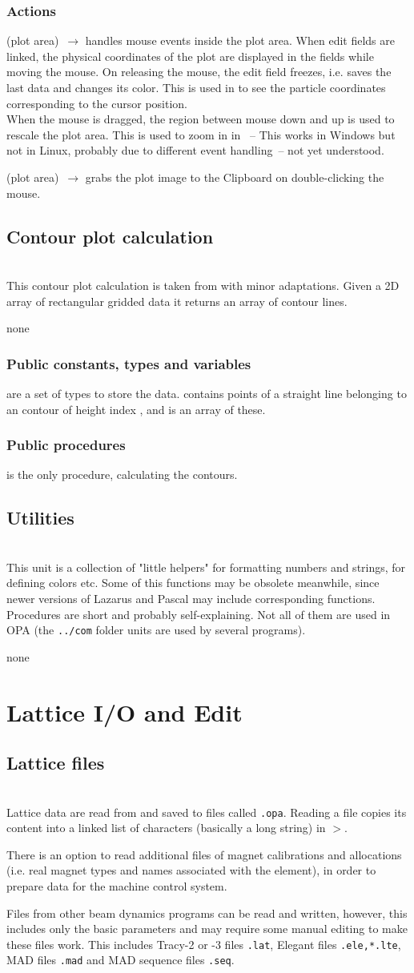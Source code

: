 \documentclass[12pt]{article}
\newcommand\code[1]{{\tt #1}}
\newcommand{\ofldx}[1]{\colorbox{black!15}{{\color{black}(#1)}}}
\newcommand\guico[1]{{\color{blue}\code{#1}}}
\newcommand\guifco[1]{{\color{violet}\code{#1}}}
\newcommand{\unico}[1]{{\color{burntorange}\code{#1}}}
\newcommand{\evcodxf}[2]{\ofldx{#1}~$\rightarrow$ \guifco{#2}}
\newcommand{\grcod}[2]{\opagui{#1}$>$\guico{#2}}
\newcommand{\opagui}[1]{\colorbox{blue!20}{{\color{black}\code{#1}}}}
\newcommand{\ogui}[1]{\hyperref[#1]{\opagui{#1}}}
\newcommand{\opauni}[1]{\colorbox{orange!30}{{\color{black}\code{#1}}}}
\newcommand{\ounih}[2]{\subsection{\label{#2}#1}{\Huge\opauni{#2}}\\}
\newcommand{\uses}[1]{\flushleft {\bf Uses:} #1}
\newcommand{\desc}[1]{#1}
\newcommand{\act}[1]{\subsubsection*{Actions} #1}
\newcommand{\pvar}[1]{\subsubsection*{Public constants, types and variables} #1}
\newcommand{\ppro}[1]{\subsubsection*{Public procedures} #1}
\newcommand{\todo}[1]{{\color{red} #1}}
\begin{document}
\act{
\evcodxf{plot area}{pMouseDown,pMouseMove,pMouseUp} handles mouse events inside the plot area.
When edit fields are linked, the physical coordinates of the plot are displayed in the fields while moving the mouse. On releasing the mouse, the edit field freezes, i.e. saves the last data and changes its color.
This is used in \ogui{opatrackps} %
to see the particle coordinates corresponding to the cursor position. \\
When the mouse is dragged, the region between mouse down and up is used to rescale the plot area. This is used to zoom in in \ogui{opageometry}~-- \todo{This works in Windows but not in Linux, probably due to different event handling~-- not yet understood.}

\evcodxf{plot area}{pDblClick} grabs the plot image to the Clipboard on double-clicking the mouse.
}



\ounih{Contour plot calculation}{../com/conrect}

\desc{This contour plot calculation is taken from \cite{CONRECT} with minor adaptations. Given a 2D array of rectangular gridded data it returns an array of contour lines.}

\uses{none}
\pvar{
\unico{Con...} are a set of types to store the data. \unico{ConLinesType} contains points of a straight line belonging to an contour of height index \unico{ih}, and \unico{ConLinesArray} is an array of these.
}
\ppro{
\unico{Conrec} is the only procedure, calculating the contours.}

\ounih{Utilities}{../com/asaux}

\desc{This unit is a collection of "little helpers" for formatting numbers and strings, for defining colors etc. Some of this functions may be obsolete meanwhile, since newer versions of Lazarus and Pascal may include corresponding functions.
Procedures are short and probably self-explaining. Not all of them are used in OPA (the \code{../com} folder units are used by several programs).}

\uses{none}

\section{\label{secedit}Lattice I/O and Edit} 

\ounih{Lattice files}{latfilelib}

\desc{Lattice data are read from and saved to files called \code{*.opa}. Reading a file copies its content into a linked list of characters (basically a long string) in \grcod{opamenu}{ReadFile}.

There is an option to read additional files of magnet calibrations and allocations (i.e. real magnet types and names associated with the element), in order to prepare data for the machine control system.

Files from other beam dynamics programs can be read and written, however, this includes only the basic parameters and may require some manual editing to make these files work. This includes Tracy-2 or -3 files \code{*.lat}, Elegant files \code{*.ele,*.lte}, MAD files \code{*.mad} and MAD sequence files \code{*.seq}.
}
\end{document}
